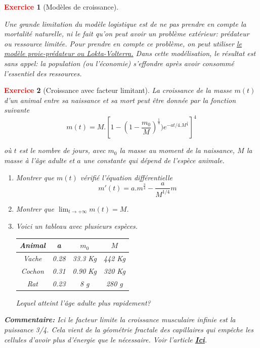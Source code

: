 \documentclass[11pt]{article}
\theoremstyle{mythmstyle}
\newtheorem{exo}{\textcolor{red}{\textbf{Exercice}}}
\begin{document}
\begin{exo}[Modèles de croissance]
\begin{enumerate}
	
	
	

Une grande limitation du modèle logistique est de ne pas prendre en compte la mortalité naturelle, ni le fait qu'on peut avoir un problème extérieur: prédateur ou ressource limitée.
Pour prendre en compte ce problème, on peut utiliser \href{https://fr.wikipedia.org/wiki/equations_de_predation_de_Lotka-Volterra}{\emph{le modèle proie-prédateur ou Lokta-Volterra.}} Dans cette modélisation, le résultat est sans appel: la population (ou l'économie) s'effondre après avoir consommé l'essentiel des ressources.
\end{enumerate}
  
\end{exo}



\begin{exo}[Croissance avec facteur limitant]
La croissance de la masse $m(t)$ d'un animal entre sa naissance et sa mort peut être donnée par la fonction suivante
$$
m(t)=M.[1-(1-\frac{m_0}{M})^{\frac{1}{4}})e^{-at/4.M^{\frac{1}{4}}}]^{4}
$$

\noindent où $t$ est le nombre de jours, avec $m_0$ la masse au moment de la naissance, $M$ la 
masse à l'âge adulte et $a$  une constante qui dépend de l'espèce animale.

\begin{enumerate}
    \item Montrer que $m(t)$ vérifié l'équation différentielle
    $$
    m'(t)= a.m^{\frac{3}{4}}- \frac{a}{M^{1/4}}m
    $$
    \item Montrer que $\lim_{t\to +\infty} m(t)= M$.
    \item Voici un tableau avec plusieurs espèces.
   
   
   \begin{center}
    \begin{tabular}{|c|c|c|c|}
  \hline
  Animal & a  & $m_0$ & $M$ \\
  \hline
  Vache & 0.28 & 33.3 Kg & 442 Kg \\
  Cochon & 0.31 & 0.90 Kg &320 Kg\\
  Rat & 0.23 & 8 g & 280 g\\
  \hline
\end{tabular}
\end{center}
 Lequel atteint l'âge adulte plus rapidement?

\end{enumerate}

\noindent \textbf{Commentaire:} Ici le facteur  limite la croissance musculaire infinie est la puissance 3/4. Cela vient de la géométrie fractale des capillaires qui empêche les cellules d’avoir plus d’énergie que le nécessaire. Voir l'article \href{https://science.sciencemag.org/content/276/5309/122}{\textbf{Ici}}.

\end{exo}
\end{document}

